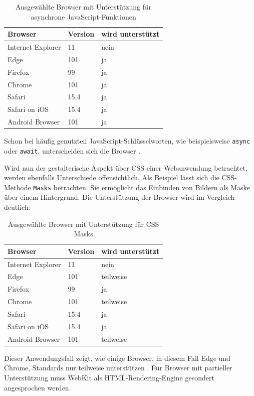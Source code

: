 \documentclass[a4paper]{scrartcl}
\begin{document}
 \begin{table}[H]
 	\caption{Ausgewählte Browser mit Unterstützung für asynchrone JavaScript-Funktionen}
 	\begin{center}
 		\begin{tabularx}{\linewidth}{| Y | Y | Y |}
 			\hline
 			\textbf{Browser} & \textbf{Version} & \textbf{wird unterstützt} \\
 			\hline \hline
 			Internet Explorer & 11 & nein \\
 			\hline
 			Edge & 101 & ja \\
 			\hline
 			Firefox & 99 & ja \\
 			\hline
 			Chrome & 101 & ja \\
 			\hline
 			Safari & 15.4 & ja \\
 			\hline
 			Safari on iOS & 15.4 & ja \\
 			\hline
 			Android Browser & 101 & ja \\
 			\hline
 		\end{tabularx}
 	\end{center}
 	\justifying
	\small	
	Schon bei häufig genutzten JavaScript-Schlüsselworten, wie beispielsweise \texttt{async} oder \texttt{await}, unterscheiden sich die Browser \autocite{Async_Functions}.  
 \end{table}

Wird nun der gestalterische Aspekt über CSS einer Webanwendung betrachtet, werden ebenfalls Unterschiede offensichtlich. Als Beispiel lässt sich die CSS-Methode \texttt{Masks} betrachten. Sie ermöglicht das Einbinden von Bildern als Maske über einem Hintergrund. Die Unterstützung der Browser wird im Vergleich deutlich:

 \begin{table}[H]
 	\caption{Ausgewählte Browser mit Unterstützung für CSS Masks}
 	\begin{center}
 		\begin{tabularx}{\linewidth}{| Y | Y | Y |}
 			\hline
 			\textbf{Browser} & \textbf{Version} & \textbf{wird unterstützt} \\
 			\hline \hline
 			Internet Explorer & 11 & nein \\
 			\hline
 			Edge & 101 & teilweise \\
 			\hline
 			Firefox & 99 & ja \\
 			\hline
 			Chrome & 101 & teilweise \\
 			\hline
 			Safari & 15.4 & ja \\
 			\hline
 			Safari on iOS & 15.4 & ja \\
 			\hline
 			Android Browser & 101 & teilweise \\
 			\hline
 		\end{tabularx}
 	\end{center}
 	\justifying
	\small	
	Dieser Anwendungsfall zeigt, wie einige Browser, in diesem Fall Edge und Chrome, Standards nur teilweise unterstützen \autocite{CSS_Masks}. Für Browser mit partieller Unterstützung muss WebKit als HTML-Rendering-Engine gesondert angesprochen werden.
 \end{table}
\end{document}
